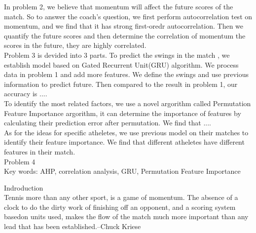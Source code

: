 \documentclass[12pt, a4paper, oneside]{article}
\theoremstyle{break}
\begin{document}
In problem 2, we believe that momentum will affect the future scores of the match. So to answer the coach's question, 
we first perform autocorrelation test on momentum, and we find that it has strong first-oredr autocorrelation. Then we quantify 
the future scores and then determine the correlation of momentum the scores in the future, they are highly correlated.\\

Problem 3 is devided into 3 parts. To predict the swings in the match , we establish model based on Gated Recurrent Unit(GRU) algorithm.
We process data in problem 1 and add more features. We define the swings and use previous information to predict future.
Then compared to the result in problem 1, our accuracy is ....\\

To identify the most related factors, we use a novel argorithm called Permutation Feature Importance argorithm, 
it can determine the importance of features by calculating their prediction error after permutation. We find that ....\\

As for the ideas for specific atheletes, we use previous model on their matches to identify their feature importance.
We find that different atheletes have different features in their match.\\

Problem 4\\

Key words: AHP, correlation analysis, GRU, Permutation Feature Importance

Indroduction\\
Tennis more than any other sport, is a game of momentum. 
The absence of a clock to do the dirty work of finishing off an opponent, 
and a scoring system basedon units used, makes the flow of the match much more important than any 
lead that has been established.--Chuck Kriese
\end{document}
